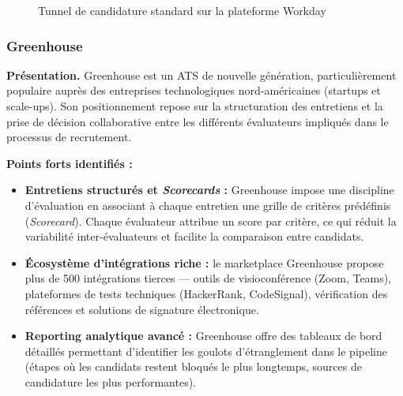 \begin{figure}[hbt!]
    \centering
    \caption{Tunnel de candidature standard sur la plateforme Workday}
    \label{fig:existant_workday}
\end{figure}

\hypertarget{Greenhouse}{}
\subsubsection{Greenhouse}

\textbf{Présentation.} Greenhouse est un ATS de nouvelle génération, particulièrement populaire auprès des entreprises technologiques nord-américaines (startups et scale-ups). Son positionnement repose sur la structuration des entretiens et la prise de décision collaborative entre les différents évaluateurs impliqués dans le processus de recrutement.

\medskip
\textbf{Points forts identifiés :}
\begin{itemize}
    \item \textbf{Entretiens structurés et \textit{Scorecards} :} Greenhouse impose une discipline d'évaluation en associant à chaque entretien une grille de critères prédéfinis (\textit{Scorecard}). Chaque évaluateur attribue un score par critère, ce qui réduit la variabilité inter-évaluateurs et facilite la comparaison entre candidats.
    \item \textbf{Écosystème d'intégrations riche :} le marketplace Greenhouse propose plus de 500 intégrations tierces --- outils de visioconférence (Zoom, Teams), plateformes de tests techniques (HackerRank, CodeSignal), vérification des références et solutions de signature électronique.
    \item \textbf{Reporting analytique avancé :} Greenhouse offre des tableaux de bord détaillés permettant d'identifier les goulots d'étranglement dans le pipeline (étapes où les candidats restent bloqués le plus longtemps, sources de candidature les plus performantes).
\end{itemize}

